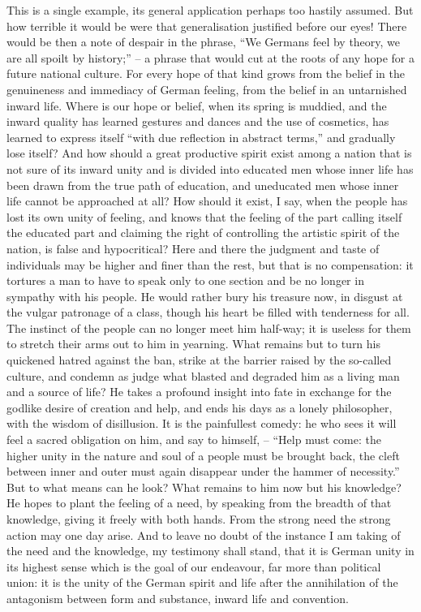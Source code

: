 This is a single example, its general application perhaps too hastily
assumed. But how terrible it would be were that generalisation
justified before our eyes! There would be then a note of despair in
the phrase, \enquote{We Germans feel by theory, we are all spoilt by
history;} -- a phrase that would cut at the roots of any hope for a
future national culture. For every hope of that kind grows from the
belief in the genuineness and immediacy of German feeling, from the
belief in an untarnished inward life. Where is our hope or belief,
when its spring is muddied, and the inward quality has learned
gestures and dances and the use of cosmetics, has learned to express
itself \enquote{with due reflection in abstract terms,} and gradually lose
itself? And how should a great productive spirit exist among a nation
that is not sure of its inward unity and is divided into educated men
whose inner life has been drawn from the true path of education, and
uneducated men whose inner life cannot be approached at all? How
should it exist, I say, when the people has lost its own unity of
feeling, and knows that the feeling of the part calling itself the
educated part and claiming the right of controlling the artistic
spirit of the nation, is false and hypocritical? Here and there the
judgment and taste of individuals may be higher and finer than the
rest, but that is no compensation: it tortures a man to have to speak
only to one section and be no longer in sympathy with his people. He
would rather bury his treasure now, in disgust at the vulgar
patronage of a class, though his heart be filled with tenderness for
all. The instinct of the people can no longer meet him half-way; it
is useless for them to stretch their arms out to him in yearning.
What remains but to turn his quickened hatred against the ban, strike
at the barrier raised by the so-called culture, and condemn as judge
what blasted and degraded him as a living man and a source of life?
He takes a profound insight into fate in exchange for the godlike
desire of creation and help, and ends his days as a lonely
philosopher, with the wisdom of disillusion. It is the painfullest
comedy: he who sees it will feel a sacred obligation on him, and say
to himself, -- \enquote{Help must come: the higher unity in the nature and soul
of a people must be brought back, the cleft between inner and outer
must again disappear under the hammer of necessity.} But to what
means can he look? What remains to him now but his knowledge? He
hopes to plant the feeling of a need, by speaking from the breadth of
that knowledge, giving it freely with both hands. From the strong
need the strong action may one day arise. And to leave no doubt of
the instance I am taking of the need and the knowledge, my testimony
shall stand, that it is German unity in its highest sense which is
the goal of our endeavour, far more than political union: it is the
unity of the German spirit and life after the annihilation of the
antagonism between form and substance, inward life and convention.
